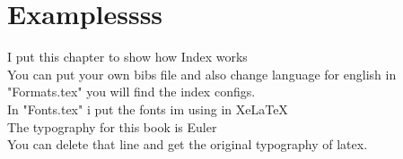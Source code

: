 \section{Examplessss}

I put this chapter to show how Index works\\

You can put your own bibs file and also change language for english in "Formats.tex" you will find the index configs.\\

In "Fonts.tex" i put the fonts im using in XeLaTeX\\

The typography for this book is Euler\\


You can delete that line and get the original typography of latex.